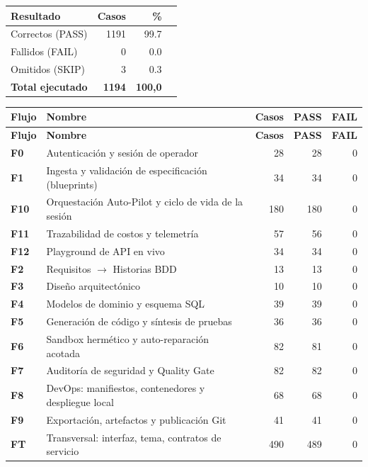\begin{center}
\begin{tabular}{lrrr}
\toprule
\textbf{Resultado} & \textbf{Casos} & \textbf{\%} & \\
\midrule
Correctos (PASS) & 1191 & 99.7 & \\
Fallidos (FAIL) & 0 & 0.0 & \\
Omitidos (SKIP) & 3 & 0.3 & \\
\midrule
\textbf{Total ejecutado} & \textbf{1194} & \textbf{100{,}0} & \\
\bottomrule
\end{tabular}
\end{center}

\begin{center}
\begin{longtable}{p{1.1cm} p{6.6cm} r r r}
\toprule
\textbf{Flujo} & \textbf{Nombre} & \textbf{Casos} & \textbf{PASS} & \textbf{FAIL} \\
\midrule
\endfirsthead
\toprule
\textbf{Flujo} & \textbf{Nombre} & \textbf{Casos} & \textbf{PASS} & \textbf{FAIL} \\
\midrule
\endhead
\textbf{F0} & Autenticación y sesión de operador & 28 & 28 & 0 \\
\textbf{F1} & Ingesta y validación de especificación (blueprints)\allowbreak{} & 34 & 34 & 0 \\
\textbf{F10} & Orquestación Auto-Pilot y ciclo de vida de la sesión & 180 & 180 & 0 \\
\textbf{F11} & Trazabilidad de costos y telemetría & 57 & 56 & 0 \\
\textbf{F12} & Playground de API en vivo & 34 & 34 & 0 \\
\textbf{F2} & Requisitos $\rightarrow$ Historias BDD & 13 & 13 & 0 \\
\textbf{F3} & Diseño arquitectónico & 10 & 10 & 0 \\
\textbf{F4} & Modelos de dominio y esquema SQL & 39 & 39 & 0 \\
\textbf{F5} & Generación de código y síntesis de pruebas & 36 & 36 & 0 \\
\textbf{F6} & Sandbox hermético y auto-reparación acotada & 82 & 81 & 0 \\
\textbf{F7} & Auditoría de seguridad y Quality Gate & 82 & 82 & 0 \\
\textbf{F8} & DevOps: manifiestos,\allowbreak{} contenedores y despliegue local & 68 & 68 & 0 \\
\textbf{F9} & Exportación,\allowbreak{} artefactos y publicación Git & 41 & 41 & 0 \\
\textbf{FT} & Transversal: interfaz,\allowbreak{} tema,\allowbreak{} contratos de servicio & 490 & 489 & 0 \\
\bottomrule
\end{longtable}
\end{center}
